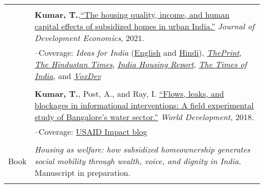 \documentclass[letterpaper, 11pt]{article}
\begin{document}
\begin{longtable}{p{1in}p{5.5in}}
& \\

&\textbf{Kumar, T.},\href{https://doi.org/10.1016/j.jdeveco.2021.102738}{``The housing quality, income, and human capital effects of subsidized homes in urban India.''} \textit{Journal of Development Economics}, 2021.\\

&--\indent Coverage: \textit{Ideas for India} (\href{https://www.ideasforindia.in/topics/poverty-inequality/household-level-effects-of-affordable-housing-evidence-from-mumbai.html}{English} and \href{https://www.ideasforindia.in/topics/poverty-inequality/household-level-effects-of-affordable-housing-evidence-from-mumbai-hindi.html}{Hindi}), \href{https://theprint.in/opinion/mumbai-residents-win-govt-housing-lottery-and-spend-more-on-kids-education-jobs-study/290485/}{\textit{ThePrint}}, \href{https://www.hindustantimes.com/opinion/housing-is-a-welfare-weapon-it-can-help-people-escape-poverty-101629993983576.html}{\textit{The Hindustan Times}}, \href{https://indiahousingreport.in/outputs/opinion/housing-is-a-welfare-weapon-it-can-help-people-escape-poverty/}{\textit{India Housing Report}}, \href{https://timesofindia.indiatimes.com/city/mumbai/mhada-home-winners-see-upswing-in-family-edu-pay-in-mumbai-study/articleshow/86468320.cms}{\textit{The Times of India}}, and \href{https://voxdev.org/topic/infrastructure-urbanisation/household-level-effects-subsidised-housing-evidence-urban-india?utm_source=dlvr.it&utm_medium=twitter}{\textit{VoxDev}} \\
& \\

&\textbf{Kumar, T.}, Post, A., and Ray, I. \href{https://www.sciencedirect.com/science/article/pii/S0305750X1830032}{``Flows, leaks, and blockages in informational interventions: A field experimental study of Bangalore's water sector.''} \textit{World Development}, 2018.\\

&--\indent Coverage: \href{https://blog.usaid.gov/2016/05/using-mobile-phones-to-alert-households-waiting-for-nextdrop-of-water/}{USAID Impact blog} \\
& \\

{{Book}} 
& \textit{Housing as welfare: how subsidized homeownership generates social mobility through wealth, voice, and dignity in India.} Manuscript in preparation. \\
& \\



\end{longtable}
\end{document}
